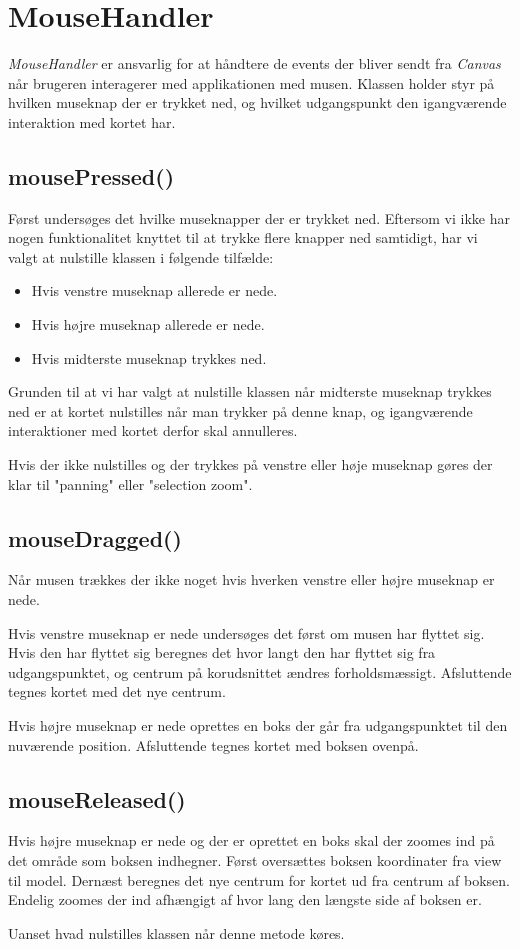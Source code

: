 \section{MouseHandler}

\emph{MouseHandler} er ansvarlig for at håndtere de events der bliver sendt fra \emph{Canvas} når brugeren interagerer med applikationen med musen. Klassen holder styr på hvilken museknap der er trykket ned, og hvilket udgangspunkt den igangværende interaktion med kortet har.

\subsection{mousePressed()}

Først undersøges det hvilke museknapper der er trykket ned. Eftersom vi ikke har nogen funktionalitet knyttet til at trykke flere knapper ned samtidigt, har vi valgt at nulstille klassen i følgende tilfælde:

\begin{itemize}
  \item Hvis venstre museknap allerede er nede.
  \item Hvis højre museknap allerede er nede.
  \item Hvis midterste museknap trykkes ned.
\end{itemize}

Grunden til at vi har valgt at nulstille klassen når midterste museknap trykkes ned er at kortet nulstilles når man trykker på denne knap, og igangværende interaktioner med kortet derfor skal annulleres.

Hvis der ikke nulstilles og der trykkes på venstre eller høje museknap gøres der klar til "panning" eller "selection zoom".

\subsection{mouseDragged()}

Når musen trækkes der ikke noget hvis hverken venstre eller højre museknap er nede.

Hvis venstre museknap er nede undersøges det først om musen har flyttet sig. Hvis den har flyttet sig beregnes det hvor langt den har flyttet sig fra udgangspunktet, og centrum på korudsnittet ændres forholdsmæssigt. Afsluttende tegnes kortet med det nye centrum.

Hvis højre museknap er nede oprettes en boks der går fra udgangspunktet til den nuværende position. Afsluttende tegnes kortet med boksen ovenpå.

\subsection{mouseReleased()}

Hvis højre museknap er nede og der er oprettet en boks skal der zoomes ind på det område som boksen indhegner. Først oversættes boksen koordinater fra view til model. Dernæst beregnes det nye centrum for kortet ud fra centrum af boksen. Endelig zoomes der ind afhængigt af hvor lang den længste side af boksen er.

Uanset hvad nulstilles klassen når denne metode køres.